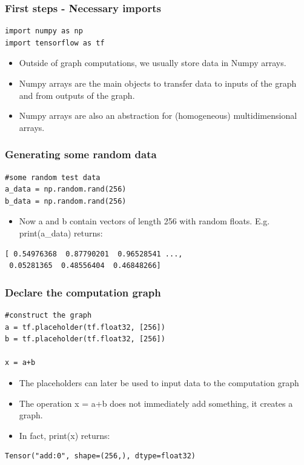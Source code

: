 \documentclass{beamer}
\begin{document}
\begin{frame}[fragile]
\frametitle{First steps - Necessary imports}

\begin{lstlisting}
import numpy as np
import tensorflow as tf
\end{lstlisting}

\begin{itemize}
 	\item Outside of graph computations, we usually store data in Numpy arrays.
 	\item Numpy arrays are the main objects to transfer data to inputs of the graph and from outputs of the graph.
 	\item Numpy arrays are also an abstraction for (homogeneous) multidimensional arrays.
\end{itemize}

\end{frame} 

\begin{frame}[fragile]
\frametitle{Generating some random data}

\begin{lstlisting}
#some random test data
a_data = np.random.rand(256)
b_data = np.random.rand(256)
\end{lstlisting}

\begin{itemize}
	\item Now a and b contain vectors of length 256 with random floats. E.g. print(a\_data) returns:
\end{itemize}

\begin{lstlisting}
[ 0.54976368  0.87790201  0.96528541 ..., 
 0.05281365  0.48556404  0.46848266]
  \end{lstlisting}

\end{frame} 


\begin{frame}[fragile]
\frametitle{Declare the computation graph}

\begin{lstlisting}
#construct the graph
a = tf.placeholder(tf.float32, [256])
b = tf.placeholder(tf.float32, [256])

x = a+b 
\end{lstlisting}

\begin{itemize}
\item The placeholders can later be used to input data to the computation graph
\item The operation x = a+b does not immediately add something, it creates a graph.
\item In fact, print(x) returns: 
\end{itemize}

\begin{lstlisting}
Tensor("add:0", shape=(256,), dtype=float32)
\end{lstlisting}

\end{frame} 
\end{document}
